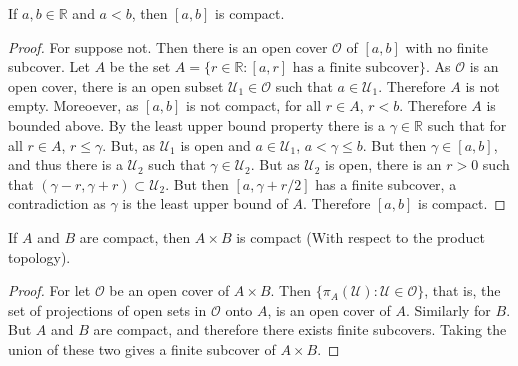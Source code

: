 \documentclass[crop=false,class=book,oneside]{standalone}
\begin{document}
            \begin{theorem}
                If $a,b\in\mathbb{R}$ and $a<b$, then
                $[a,b]$ is compact.
            \end{theorem}
            \begin{proof}
                For suppose not. Then there is an open
                cover $\mathcal{O}$ of $[a,b]$ with no finite
                subcover. Let $A$ be the set
                $A=\{r\in\mathbb{R}:[a,r]%
                     \textrm{ has a finite subcover}\}$.
                As $\mathcal{O}$ is an open cover, there is
                an open subset $\mathcal{U}_{1}\in\mathcal{O}$ such
                that $a\in\mathcal{U}_{1}$. Therefore $A$ is
                not empty. Moreoever, as $[a,b]$ is not compact,
                for all $r\in{A}$, $r<b$. Therefore $A$ is bounded
                above. By the least upper bound property there
                is a $\gamma\in\mathbb{R}$ such that for
                all $r\in{A}$, $r\leq\gamma$. But, as
                $\mathcal{U}_{1}$ is open and $a\in\mathcal{U}_{1}$,
                $a<\gamma\leq{b}$. But then $\gamma\in[a,b]$, and
                thus there is a $\mathcal{U}_{2}$ such that
                $\gamma\in\mathcal{U}_{2}$. But as
                $\mathcal{U}_{2}$ is open, there is an $r>0$ such
                that $(\gamma-r,\gamma+r)\subset\mathcal{U}_{2}$.
                But then $[a,\gamma+r/2]$ has a finite subcover,
                a contradiction as $\gamma$ is the least upper bound
                of $A$. Therefore $[a,b]$ is compact.
            \end{proof}
            \begin{theorem}
                \label{%
                    theorem:surgery_theory_%
                    product_of_compact_is_compact
                }
                If $A$ and $B$ are compact, then
                $A\times{B}$ is compact (With respect to the
                product topology).
            \end{theorem}
            \begin{proof}
                For let $\mathcal{O}$ be an open cover
                of $A\times{B}$.  Then
                $\{\pi_{A}(\mathcal{U}):\mathcal{U}\in\mathcal{O}\}$,
                that is, the set of projections of open sets in
                $\mathcal{O}$ onto $A$, is an open cover of $A$.
                Similarly for $B$. But $A$ and $B$ are compact, and
                therefore there exists finite subcovers. Taking the
                union of these two gives
                a finite subcover of $A\times{B}$.
            \end{proof}
\end{document}
